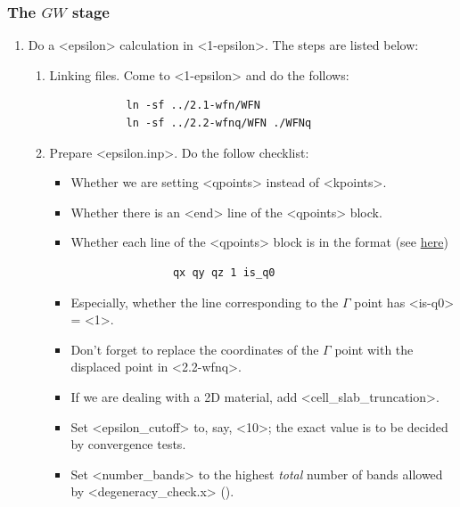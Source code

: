 \documentclass[hyperref, a4paper, 12pt]{report}
\def\texttt#1{<#1>}%
\newcommand{\shortcode}[1]{\texttt{#1}}
\begin{document}
\subsubsection{The $GW$ stage}\label{sec:sop.gw}

\begin{enumerate}
    \item Do a \shortcode{epsilon} calculation in \shortcode{1-epsilon}. The steps are listed below:
    \begin{enumerate}
        \item Linking files. 
        Come to \shortcode{1-epsilon} and do the follows:
        \begin{lstlisting}
            ln -sf ../2.1-wfn/WFN
            ln -sf ../2.2-wfnq/WFN ./WFNq
        \end{lstlisting}
        \item Prepare \shortcode{epsilon.inp}. Do the follow checklist:
        \begin{itemize}
            \item Whether we are setting \shortcode{qpoints} instead of \shortcode{kpoints}.
            \item Whether there is an \shortcode{end} line of the \shortcode{qpoints} block.
            \item Whether each line of the \shortcode{qpoints} block is in the format
            (see \href{http://manual.berkeleygw.org/3.0/epsilon-keywords/#qpoints}{here})
            \begin{lstlisting}
                qx qy qz 1 is_q0
            \end{lstlisting}
            \item Especially, whether the line corresponding to the $\Gamma$ point
            has \shortcode{is-q0} = \shortcode{1}.
            \item Don't forget to replace the coordinates of the $\Gamma$ point
            with the displaced point in \shortcode{2.2-wfnq}.
            \item If we are dealing with a 2D material, add \shortcode{cell_slab_truncation}.
            \item Set \shortcode{epsilon_cutoff} to, say, \shortcode{10}; 
            the exact value is to be decided by convergence tests.
            \item Set \shortcode{number_bands} to the highest \emph{total} number of bands 
            allowed by \shortcode{degeneracy_check.x} (). 
        \end{itemize}

\end{enumerate}
\end{enumerate}
\end{document}

